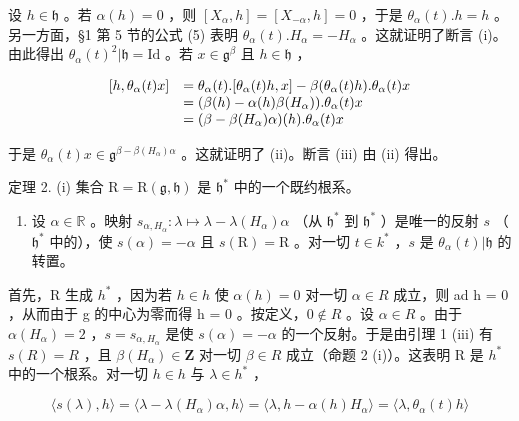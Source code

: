 设 \(h \in \mathfrak{h}\) 。若 \(\alpha(h) = 0\) ，则 \([X_{\alpha}, h] = [X_{-\alpha}, h] = 0\) ，于是 \(\theta_{\alpha}(t).h = h\) 。另一方面，§1 第 5 节的公式 (5) 表明 \(\theta_{\alpha}(t).H_{\alpha} = -H_{\alpha}\) 。这就证明了断言 (i)。由此得出 \(\theta_{\alpha}(t)^2 | \mathfrak{h} = \mathrm{Id}\) 。若 \(x \in \mathfrak{g}^{\beta}\) 且 \(h \in \mathfrak{h}\) ，

\[
\begin{array}{r l} [ h, \theta_ {\alpha} (t) x ] & = \theta_ {\alpha} (t). [ \theta_ {\alpha} (t) h, x ] - \beta (\theta_ {\alpha} (t) h). \theta_ {\alpha} (t) x \\ & = (\beta (h) - \alpha (h) \beta (H _ {\alpha})). \theta_ {\alpha} (t) x \\ & = (\beta - \beta (H _ {\alpha}) \alpha) (h). \theta_ {\alpha} (t) x \end{array}
\]

于是 \(\theta_{\alpha}(t)x\in \mathfrak{g}^{\beta -\beta (H_{\alpha})\alpha}\) 。这就证明了 (ii)。断言 (iii) 由 (ii) 得出。

定理 2. (i) 集合 \(\mathrm{R} = \mathrm{R}(\mathfrak{g},\mathfrak{h})\) 是 \(\mathfrak{h}^*\) 中的一个既约根系。

\begin{enumerate}
\def\labelenumi{(\roman{enumi})}
\setcounter{enumi}{1}
\tightlist
\item
  设 \(\alpha \in \mathbb{R}\) 。映射 \(s_{\alpha, H_\alpha}: \lambda \mapsto \lambda - \lambda(H_\alpha)\alpha\) （从 \(\mathfrak{h}^*\) 到 \(\mathfrak{h}^*\) ）是唯一的反射 \(s\) （\(\mathfrak{h}^*\) 中的），使 \(s(\alpha) = -\alpha\) 且 \(s(\mathrm{R}) = \mathrm{R}\) 。对一切 \(t \in k^*\) ，\(s\) 是 \(\theta_\alpha(t)|\mathfrak{h}\) 的转置。
\end{enumerate}

首先，R 生成 \(h^{*}\) ，因为若 \(h \in h\) 使 \(\alpha(h) = 0\) 对一切 \(\alpha \in R\) 成立，则 ad h = 0 ，从而由于 g 的中心为零而得 h = 0 。按定义，\(0 \notin R\) 。设 \(\alpha \in R\) 。由于 \(\alpha(H_{\alpha}) = 2\) ，\(s = s_{\alpha,H_{\alpha}}\) 是使 \(s(\alpha) = -\alpha\) 的一个反射。于是由引理 1 (iii) 有 \(s(R) = R\) ，且 \(\beta(H_{\alpha}) \in \mathbf{Z}\) 对一切 \(\beta \in R\) 成立（命题 2 (i)）。这表明 R 是 \(h^{*}\) 中的一个根系。对一切 \(h \in h\) 与 \(\lambda \in h^{*}\) ，

\[
\langle s (\lambda), h \rangle = \langle \lambda - \lambda (H _ {\alpha}) \alpha , h \rangle = \langle \lambda , h - \alpha (h) H _ {\alpha} \rangle = \langle \lambda , \theta_ {\alpha} (t) h \rangle
\]

